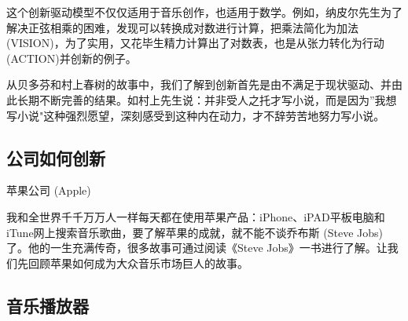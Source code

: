 这个创新驱动模型不仅仅适用于音乐创作，也适用于数学。例如，纳皮尔先生为了解决正弦相乘的困难，发现可以转换成对数进行计算，把乘法简化为加法(VISION)，为了实用，又花毕生精力计算出了对数表，也是从张力转化为行动(ACTION)并创新的例子。 

从贝多芬和村上春树的故事中，我们了解到创新首先是由不满足于现状驱动、并由此长期不断完善的结果。如村上先生说：并非受人之托才写小说，而是因为”我想写小说"这种强烈愿望，深刻感受到这种内在动力，才不辞劳苦地努力写小说。 



\hypertarget{ux516cux53f8ux5982ux4f55ux521bux65b0}{%
\subsection{公司如何创新}\label{ux516cux53f8ux5982ux4f55ux521bux65b0}}


苹果公司 (Apple)

我和全世界千千万万人一样每天都在使用苹果产品：iPhone、iPAD平板电脑和iTune网上搜索音乐歌曲，要了解苹果的成就，就不能不谈乔布斯 (Steve Jobs)了。他的一生充满传奇，很多故事可通过阅读《Steve Jobs》一书进行了解。让我们先回顾苹果如何成为大众音乐市场巨人的故事。

\begin{description}
\item[]
\begin{description}
\tightlist
\item[]
= = =
\end{description}
\end{description}

\hypertarget{ux97f3ux4e50ux64adux653eux5668}{%
\subsection{音乐播放器}\label{ux97f3ux4e50ux64adux653eux5668}}


